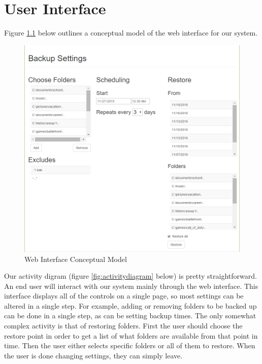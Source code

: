 \chapter{User Interface}

Figure \ref{fig:mockup} below outlines a conceptual model of the web interface for our system.

\begin{figure}[h]
	\centering
\includegraphics[scale=0.45]{images/mockup.png}
	\caption{Web Interface Conceptual Model}
	\label{fig:mockup}
\end{figure}

Our activity digram (figure \ref{fig:activitydiagram} below) is pretty straightforward.  An end user will interact with our system mainly through the web interface.  This interface displays all of the controls on a single page, so most settings can be altered in a single step.  For example, adding or removing folders to be backed up can be done in a single step, as can be setting backup times.  The only somewhat complex activity is that of restoring folders.  First the user should choose the restore point in order to get a list of what folders are available from that point in time.  Then the user either selects specific folders or all of them to restore.  When the user is done changing settings, they can simply leave.


